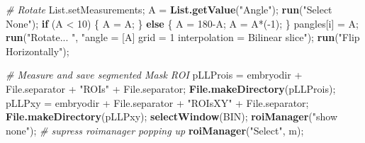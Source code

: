 \documentclass[11pt,singlespacinge,twoside]{reedthesis} %
\newenvironment{Shaded}{}{}
\newcommand{\CommentTok}[1]{\textit{#1}}
\newcommand{\ControlFlowTok}[1]{\textbf{#1}}
\newcommand{\DecValTok}[1]{#1}
\newcommand{\KeywordTok}[1]{\textbf{#1}}
\newcommand{\NormalTok}[1]{#1}
\newcommand{\OperatorTok}[1]{#1}
\newcommand{\StringTok}[1]{#1}
\theoremstyle{definition}
\theoremstyle{definition}
\theoremstyle{definition}
\theoremstyle{remark}
\begin{document}
\begin{Shaded}
\begin{Highlighting}[numbers=left,,]
  \CommentTok{# Rotate}
\NormalTok{        List.setMeasurements;}
\NormalTok{        A =}\StringTok{ }\KeywordTok{List.getValue}\NormalTok{(}\StringTok{"Angle"}\NormalTok{);}
        \KeywordTok{run}\NormalTok{(}\StringTok{"Select None"}\NormalTok{);}
        \ControlFlowTok{if}\NormalTok{ (A }\OperatorTok{<}\StringTok{ }\DecValTok{10}\NormalTok{) \{}
\NormalTok{            A =}\StringTok{ }\NormalTok{A;}
\NormalTok{        \} }\ControlFlowTok{else}\NormalTok{ \{}
\NormalTok{            A =}\StringTok{ }\DecValTok{180}\OperatorTok{-}\NormalTok{A;}
\NormalTok{            A =}\StringTok{ }\NormalTok{A}\OperatorTok{*}\NormalTok{(}\OperatorTok{-}\DecValTok{1}\NormalTok{);}
\NormalTok{        \}}
\NormalTok{        pangles[i] =}\StringTok{ }\NormalTok{A;}
        \KeywordTok{run}\NormalTok{(}\StringTok{"Rotate... "}\NormalTok{, }\StringTok{"angle = [A] grid = 1 interpolation = Bilinear slice"}\NormalTok{);}
        \KeywordTok{run}\NormalTok{(}\StringTok{"Flip Horizontally"}\NormalTok{);}
            
  \CommentTok{# Measure and save segmented Mask ROI}
\NormalTok{        pLLProis =}\StringTok{ }\NormalTok{embryodir }\OperatorTok{+}\StringTok{ }\NormalTok{File.separator }\OperatorTok{+}\StringTok{ "ROIs"} \OperatorTok{+}\StringTok{ }\NormalTok{File.separator;}
        \KeywordTok{File.makeDirectory}\NormalTok{(pLLProis);}
\NormalTok{        pLLPxy =}\StringTok{ }\NormalTok{embryodir }\OperatorTok{+}\StringTok{ }\NormalTok{File.separator }\OperatorTok{+}\StringTok{ "ROIsXY"} \OperatorTok{+}\StringTok{ }\NormalTok{File.separator;}
        \KeywordTok{File.makeDirectory}\NormalTok{(pLLPxy);}
        \KeywordTok{selectWindow}\NormalTok{(BIN);}
        \KeywordTok{roiManager}\NormalTok{(}\StringTok{"show none"}\NormalTok{); }\CommentTok{# supress roimanager popping up}
        \KeywordTok{roiManager}\NormalTok{(}\StringTok{"Select"}\NormalTok{, m);}
            

\end{Highlighting}
\end{Shaded}
\end{document}
